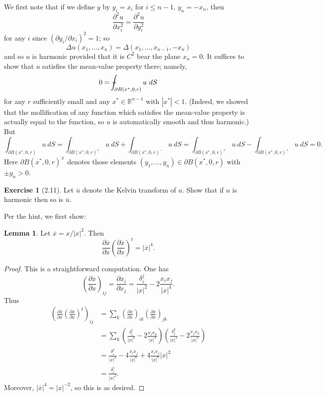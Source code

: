 \documentclass[10pt]{article}
\newcommand{\RR}{\mathbb{R}}
\def\Xint#1{\mathchoice
{\XXint\displaystyle\textstyle{#1}}%
{\XXint\textstyle\scriptstyle{#1}}%
{\XXint\scriptstyle\scriptscriptstyle{#1}}%
{\XXint\scriptscriptstyle\scriptscriptstyle{#1}}%
\!\int}
\def\XXint#1#2#3{{\setbox0=\hbox{$#1{#2#3}{\int}$ }
\vcenter{\hbox{$#2#3$ }}\kern-.6\wd0}}
\def\dashint{\Xint-}
\theoremstyle{definition}
\newtheorem{exer}{Exercise}
\newtheorem{lemma}{Lemma}[exer]
\begin{document}
We first note that if we define $y$ by $y_i = x_i$ for $i \leq n-1$, $y_n = -x_n$, then
$$\frac{\partial^2 u}{\partial x_i^2} = \frac{\partial^2 u}{\partial y_i^2}$$
for any $i$ since $(\partial y_i/\partial x_i)^2 = 1$; so
$$\Delta u(x_1, \dots, x_n) = \Delta(x_1, \dots, x_{n-1}, -x_n)$$
and so $u$ is harmonic provided that it is $C^2$ bear the plane $x_n = 0$.
It suffices to show that $u$ satisfies the mean-value property there; namely,
$$0 = \dashint_{\partial B(x^*, 0, r)} u~dS$$
for any $r$ sufficiently small and any $x^* \in \RR^{n-1}$ with $|x^*| < 1$.
(Indeed, we showed that the mollification of any function which satisfies the mean-value property is actually equal to the function, so $u$ is automatically smooth and thus harmonic.)
But
$$\int_{\partial B(x^*, 0, r)} u~dS = \int_{\partial B(x^*, 0, r)^+} u~dS + \int_{\partial B(x^*, 0, r)^-} u~dS = \int_{\partial B(x^*, 0, r)^+} u~dS - \int_{\partial B(x^*, 0, r)^+} u~dS = 0.$$
Here $\partial B(x^*, 0, r)^\pm$ denotes those elements $(y_1, \dots, y_n) \in \partial B(x^*, 0, r)$ with $\pm y_n > 0$.

\begin{exer}[2.11]
Let $\overline u$ denote the Kelvin transform of $u$. Show that if $u$ is harmonic then so is $\overline u$.
\end{exer}

Per the hint, we first show:

\begin{lemma}
Let $\overline x = x/|x|^2$. Then
$$\frac{\partial \overline x}{\partial x} \left(\frac{\partial \overline x}{\partial x}\right)^t = |\overline x|^4.$$
\end{lemma}
\begin{proof}
This is a straightforward computation. One has
$$\left(\frac{\partial \overline x}{\partial x}\right)_{ij} = \frac{\partial \overline x_i}{\partial x_j} = \frac{\delta_i^j}{|x|^2} - 2\frac{x_ix_j}{|x|^4}.$$
Thus
\begin{align*}\left(\frac{\partial \overline x}{\partial x} \left(\frac{\partial \overline x}{\partial x}\right)^t\right)_{ij} &= \sum_k \left(\frac{\partial \overline x}{\partial x}\right)_{ik} \left(\frac{\partial \overline x}{\partial x}\right)_{jk}\\
& = \sum_k \left(\frac{\delta_i^j}{|x|^2} - 2\frac{x_ix_k}{|x|^4}\right)\left(\frac{\delta_j^k}{|x|^2} - 2\frac{x_jx_k}{|x|^4}\right)\\
&= \frac{\delta_i^j}{|x|^2} - 4\frac{x_ix_j}{|x|^6} + 4\frac{x_ix_j}{|x|^8}|x|^2 \\
&= \frac{\delta_i^j}{|x|^2}.
\end{align*}
Moreover, $|\overline x|^4 = |x|^{-2}$, so this is as desired.
\end{proof}
\end{document}
